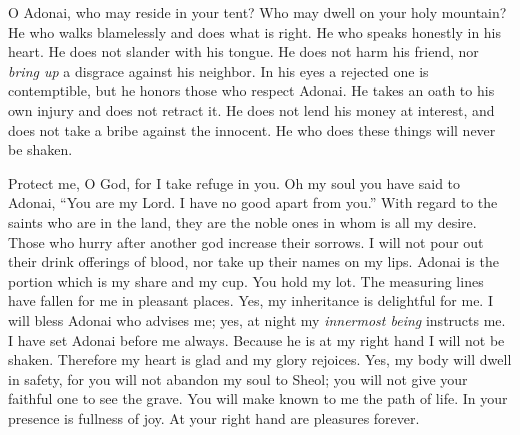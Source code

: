 \begin{biblechapter} %
 O Adonai, who may reside in your tent? 
Who may dwell on your holy mountain?
\verse He who walks blamelessly and does what is right. 
He who speaks honestly in his heart.
\verse He does not slander with his tongue. 
He does not harm his friend, 
nor \textit{bring up} a disgrace against his neighbor.
\verse In his eyes a rejected one is contemptible, 
but he honors those who respect Adonai. 
He takes an oath to his own injury and does not retract it.
\verse He does not lend his money at interest, 
and does not take a bribe against the innocent. 
He who does these things 
will never be shaken.
\end{biblechapter}

\begin{biblechapter} %
 Protect me, O God, 
for I take refuge in you.
\verse Oh my soul you have said to Adonai, “You are my Lord. 
I have no good apart from you.”
\verse With regard to the saints who are in the land, 
they are the noble ones in whom is all my desire.
\verse Those who hurry after another god increase their sorrows. 
I will not pour out their drink offerings of blood, 
nor take up their names on my lips.
\verse Adonai is the portion which is my share and my cup. 
You hold my lot.
\verse The measuring lines have fallen for me in pleasant places. 
Yes, my inheritance is delightful for me.
\verse I will bless Adonai who advises me; 
yes, at night my \textit{innermost being} instructs me.
\verse I have set Adonai before me always. 
Because he is at my right hand I will not be shaken.
\verse Therefore my heart is glad and my glory rejoices. 
Yes, my body will dwell in safety,
\verse for you will not abandon my soul to Sheol; 
you will not give your faithful one to see the grave.
\verse You will make known to me the path of life. 
In your presence is fullness of joy. 
At your right hand are pleasures forever.
\end{biblechapter}

